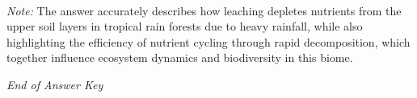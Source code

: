 \documentclass[12pt]{article}
\begin{document}
\begin{enumerate}[label=\arabic*.]
\\ \textit{Note:} The answer accurately describes how leaching depletes nutrients from the upper soil layers in tropical rain forests due to heavy rainfall, while also highlighting the efficiency of nutrient cycling through rapid decomposition, which together influence ecosystem dynamics and biodiversity in this biome.
\end{enumerate}

\vfill
\noindent\textit{End of Answer Key}
\end{document}
